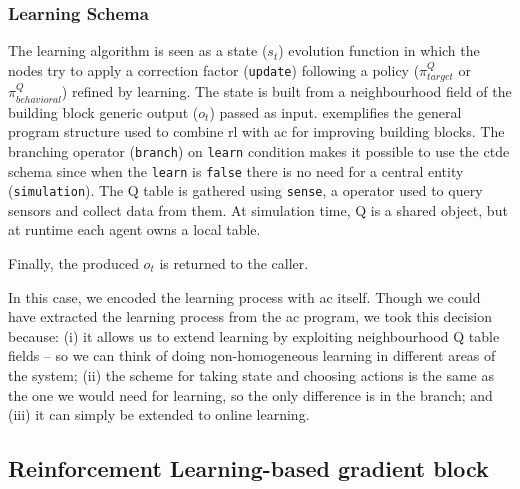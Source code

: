 \subsubsection{Learning Schema} 

The learning algorithm is seen as a state ($s_t$) evolution function in which the nodes try to apply a correction factor (\lstinline|update|) following a policy ($\pi^Q_{target}$ or $\pi^Q_{behavioral}$) refined by learning.
%
The state is built from a neighbourhood field of the building block generic output ($o_t$) passed as input.
%
 exemplifies the general program structure used to combine \ac{rl} with \ac{ac} for improving building blocks.
%
The branching operator (\lstinline|branch|) on \lstinline|learn| condition makes it possible to use the \ac{ctde} schema since when the \lstinline|learn| is \lstinline|false| there is no need for a central entity (\lstinline|simulation|).
%
The Q table is gathered using \lstinline|sense|, a \scafi{} operator used to query sensors and collect data from them. 
%
At simulation time, Q is a shared object, but at runtime each agent owns a local table.
%

%
Finally, the produced $o_{t}$ is returned to the caller.

In this case, we encoded the learning process with \ac{ac} itself. 
%
Though we could have extracted the learning process from the \ac{ac} program, %
 we took this decision because: 
  (i) it allows us to extend learning by exploiting neighbourhood Q table fields -- so we can think of doing non-homogeneous learning in different areas of the system;
  (ii) the scheme for taking state and choosing actions is the same as the one we would need for learning, so the only difference is in the branch; and
  (iii) it can simply be extended to online learning.
%

\subsection{Reinforcement Learning-based gradient block}

